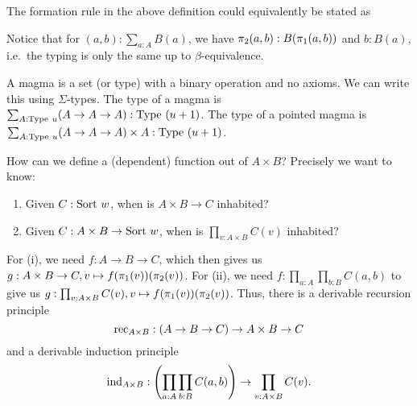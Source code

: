 \begin{rem}
    The formation rule in the above definition could equivalently be stated as 
    \begin{prooftree}
    \end{prooftree}
\end{rem}

\begin{rem}
    Notice that for $(a, b) : \sum_{a : A} B(a)$, we have $\piproj{2}{a, b} : B(\piproj{1}{a, b})$ and $b : B(a)$, i.e.\ the typing is only the same up to $\beta$-equivalence.
\end{rem}

\begin{example}
    A \alert{magma} is a set (or type) with a binary operation and no axioms.
    We can write this using $\Sigma$-types. 
    The type of a magma is $\sum_{A : \typeu{u}} (A \to A \to A) : \typeu{(u + 1)}$. 
    The type of a pointed magma is $\sum_{A : \typeu{u}} (A \to A \to A) \times A : \typeu{(u + 1)}$.
\end{example}

\begin{rem}
    How can we define a (dependent) function out of $A \times B$?
    Precisely we want to know:
    \begin{enumerate}
        \item Given $C : \sortu{w}$, when is $A \times B \to C$ inhabited?
        \item Given $C : A \times B \to \sortu{w}$, when is $\prod_{v : A \times B} C(v)$ inhabited?
    \end{enumerate} 
    For (i), we need $f : A \to B \to C$, which then gives us $g : A \times B \to C, v \mapsto f(\piproj{1}{v})(\piproj{2}{v})$. 
    For (ii), we need $f : \prod_{a : A}\prod_{b : B}C(a, b)$ to give us $g : \prod_{v : A \times B} C(v), v \mapsto f(\piproj{1}{v})(\piproj{2}{v})$.
    Thus, there is a derivable recursion principle 
    \begin{equation*}
        \rec{A \times B} : (A \to B \to C) \to A \times B \to C
    \end{equation*}
    and a derivable induction principle
    \begin{equation*}
        \ind{A \times B} : \left(\prod_{a : A}\prod_{b : B}C(a, b)\right) \to \prod_{v : A \times B} C(v).
    \end{equation*}
\end{rem}

